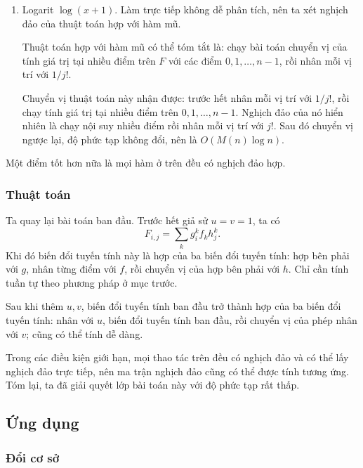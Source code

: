 \documentclass[11pt]{article}
\begin{document}
\begin{enumerate}
  Bài toán trên giống bài toán chuyển vị của tính giá trị tại nhiều điểm đã
  nhắc tới trước đó, nên có thể giải bằng chia để trị và nhân đa thức. Độ phức
  tạp là \(O(M(n)\log n)\).

  \item Logarit \(\log(x+1)\). Làm trực tiếp không dễ phân tích, nên ta xét
  nghịch đảo của thuật toán hợp với hàm mũ.

  Thuật toán hợp với hàm mũ có thể tóm tắt là: chạy bài toán chuyển vị của tính
  giá trị tại nhiều điểm trên \(F\) với các điểm \(0,1,\ldots,n-1\), rồi nhân
  mỗi vị trí với \(1/j!\).

  Chuyển vị thuật toán này nhận được: trước hết nhân mỗi vị trí với \(1/j!\),
  rồi chạy tính giá trị tại nhiều điểm trên \(0,1,\ldots,n-1\). Nghịch đảo của
  nó hiển nhiên là chạy nội suy nhiều điểm rồi nhân mỗi vị trí với \(j!\). Sau
  đó chuyển vị ngược lại, độ phức tạp không đổi, nên là \(O(M(n)\log n)\).
\end{enumerate}

Một điểm tốt hơn nữa là mọi hàm ở trên đều có nghịch đảo hợp.

\subsubsection{Thuật toán}

Ta quay lại bài toán ban đầu. Trước hết giả sử \(u=v=1\), ta có
\[
  F_{i,j}=\sum_k g_i^k f_k h_j^k.
\]
Khi đó biến đổi tuyến tính này là hợp của ba biến đổi tuyến tính: hợp bên phải
với \(g\), nhân từng điểm với \(f\), rồi chuyển vị của hợp bên phải với \(h\).
Chỉ cần tính tuần tự theo phương pháp ở mục trước.

Sau khi thêm \(u,v\), biến đổi tuyến tính ban đầu trở thành hợp của ba biến đổi
tuyến tính: nhân với \(u\), biến đổi tuyến tính ban đầu, rồi chuyển vị của
phép nhân với \(v\); cũng có thể tính dễ dàng.

Trong các điều kiện giới hạn, mọi thao tác trên đều có nghịch đảo và có thể lấy
nghịch đảo trực tiếp, nên ma trận nghịch đảo cũng có thể được tính tương ứng.
Tóm lại, ta đã giải quyết lớp bài toán này với độ phức tạp rất thấp.

\subsection{Ứng dụng}

\subsubsection{Đổi cơ sở}
\end{document}

